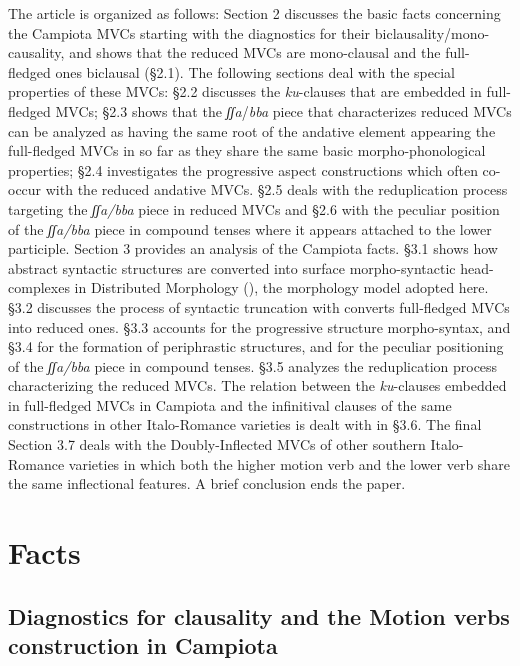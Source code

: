 \documentclass[output=paper]{langscibook}
\begin{document}
The article is organized as follows:  Section 2 discusses the basic facts concerning the Campiota MVCs starting with the diagnostics for their biclausality/mono-causality, and shows that the reduced MVCs are mono-clausal and the full-fledged ones biclausal (§2.1).  The following sections deal with the special properties of these MVCs:  §2.2 discusses the \textit{ku}-clauses that are embedded in full-fledged MVCs; §2.3 shows that the \textit{ʃʃa}/\textit{bba} piece that characterizes reduced MVCs can be analyzed as having the same root of the andative element appearing  the full-fledged MVCs in so far as they share the same basic morpho-phonological properties; §2.4 investigates the progressive aspect constructions which often co-occur with the reduced andative MVCs. §2.5 deals with the reduplication process targeting the \textit{ʃʃa/bba} piece in reduced MVCs and §2.6 with the peculiar position of the \textit{ʃʃa/bba} piece in compound tenses where it appears attached to the lower participle.  Section 3 provides an analysis of the Campiota facts. §3.1 shows how abstract syntactic structures are converted into surface morpho-syntactic head-complexes in Distributed Morphology (\citealt{halle1993a}), the morphology model adopted here. §3.2 discusses the process of syntactic truncation with converts full-fledged MVCs into reduced ones. §3.3 accounts for the progressive structure morpho-syntax, and §3.4 for the formation of periphrastic structures, and for the peculiar positioning of the \textit{ʃʃa/bba} piece in compound tenses. §3.5 analyzes the reduplication process characterizing the reduced MVCs. The relation between the \textit{ku}-clauses embedded in full-fledged MVCs in Campiota and the infinitival clauses of the same constructions in other Italo-Romance varieties is dealt with in §3.6. The final Section 3.7 deals with the Doubly-Inflected MVCs of other southern Italo-Romance varieties in which both the higher motion verb and the lower verb share the same inflectional features. A brief conclusion ends the paper.

\section{Facts}
\subsection{Diagnostics for clausality and the Motion verbs construction in Campiota}
\end{document}
